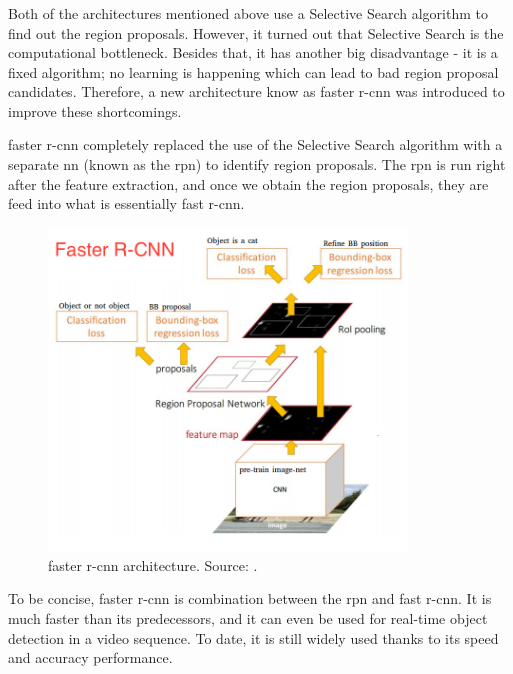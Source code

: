         \subsubsection{}
            Both of the architectures mentioned above use a Selective Search algorithm to find out the region proposals. However, it turned out that Selective Search is the computational bottleneck. Besides that, it has another big disadvantage - it is a fixed algorithm; no learning is happening which can lead to bad region proposal candidates. Therefore, a new architecture know as \gls{faster r-cnn} \cite{ren2015faster} was introduced to improve these shortcomings. 
            
            \Gls{faster r-cnn} completely replaced the use of the Selective Search algorithm with a separate \gls{nn} (known as the \gls{rpn}) to identify region proposals. The \gls{rpn} is run right after the feature extraction, and once we obtain the region proposals, they are feed into what is essentially \gls{fast r-cnn}.

            \begin{figure}[ht]
                \centering
                \includegraphics[width=0.85\textwidth]{resources/faster_r_cnn_architecture.png}
                \caption{\Gls{faster r-cnn} architecture. Source: \cite{xuobjectdetection}.}
                \label{fig:faster r-cnn architecture}
            \end{figure}
            
            To be concise, \gls{faster r-cnn} is combination between the \gls{rpn} and \gls{fast r-cnn}. It is much faster than its predecessors, and it can even be used for real-time object detection in a video sequence. To date, it is still widely used thanks to its speed and accuracy performance.
            
